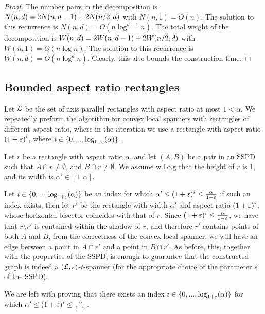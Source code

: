 \documentclass[12pt]{article}%
\begin{document}
\begin{proof}
    The number pairs in the decomposition is
    \begin{math}
        N(n,d) = 2N(n,d-1) + 2N\pth{ n/2, d }
    \end{math}
    with $N(n,1) = O(n)$. The solution to this recurrence is
    $N(n,d) = O( n \log^{d-1} n)$.
    The total weight of the decomposition is
    \begin{math}
        W(n,d) = 2W(n,d-1) + 2W\pth{ n/2, d }
    \end{math}
    with $W(n,1) = O(n \log n)$. The solution to this recurrence is
    $W(n,d) = O( n \log^{d} n)$. Clearly, this also bounds the
    construction time.
\end{proof}


\subsection{Bounded aspect ratio rectangles}
Let $\mathcal{L}$ be the set of axis parallel rectangles with aspect ratio at
most $1<\alpha$. We repeatedly preform the algorithm for convex local
spanners with rectangles of different aspect-ratio, where in the
$i$\th iteration we use a rectangle with aspect ratio
$\left(1+\varepsilon\right)^i$, where $i\in\{0,...,\log_{1+\varepsilon}(\alpha)\}$.

Let $r$ be a rectangle with aspect ratio $\alpha$, and let $(A,B)$ be
a pair in an SSPD such that $A\cap r\neq \emptyset$, and
$B\cap r\neq \emptyset$. We assume w.l.o.g that the height of $r$ is
1, and its width is $\alpha'\in [1,\alpha]$.

Let $i\in \{0,...,\log_{1+\varepsilon}(\alpha)\}$ be an index for which
$\alpha' \leq (1+\varepsilon)^i \leq \frac{\alpha}{1-\varepsilon}$ if such an index
exists, then let $r'$ be the rectangle with width $\alpha'$ and aspect
ratio $(1+\varepsilon)^i$, whose horizontal bisector coincides with that of
$r$. Since $(1+\varepsilon)^i \leq \frac{\alpha}{1-\varepsilon}$, we have that
$r\setminus r'$ is contained within the shadow of $r$, and therefore
$r'$ contains points of both $A$ and $B$, from the correctness of the
convex local spanner, we will have an edge between a point in
$A\cap r'$ and a point in $B\cap r'$. As before, this, together with
the properties of the SSPD, is enough to guarantee that the
constructed graph is indeed a $(\mathcal{L}, \varepsilon)$-$t$-spanner (for the
appropriate choice of the parameter $s$ of the SSPD).

We are left with proving that there exists an index
$i\in \{0,...,\log_{1+\varepsilon}(\alpha)\}$ for which
$\alpha' \leq (1+\varepsilon)^i \leq \frac{\alpha}{1-\varepsilon}$.
\end{document}
